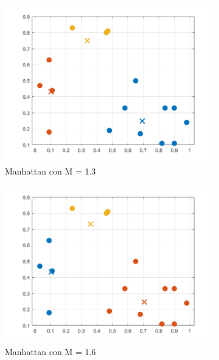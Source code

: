 \documentclass[11pt, letterpaper]{article}
\begin{document}
\begin{figure}[h!]
	\centering
	\begin{subfigure}[b]{0.50\textwidth}
		\includegraphics[width=\textwidth]{IMG/R31.png}
		\caption{Manhattan con M = 1.3}
		\label{fig:r7}
	\end{subfigure}\hfill
	\begin{subfigure}[b]{0.50\textwidth}
		\includegraphics[width=\textwidth]{IMG/R32.png}
		\caption{Manhattan con  M = 1.6}
		\label{fig:r8}
	\end{subfigure}
	\vspace{\baselineskip} %
	\begin{subfigure}[b]{0.50\textwidth}

\end{subfigure}
\end{figure}
\end{document}
